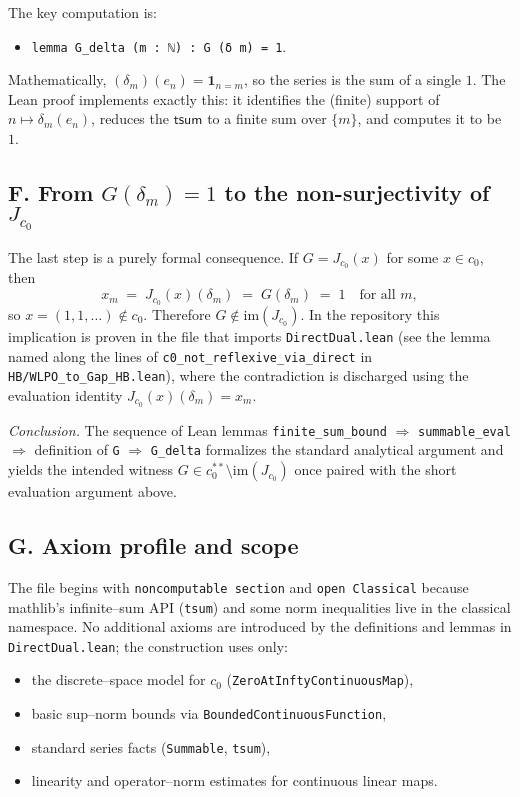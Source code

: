 \documentclass[11pt]{article}
\begin{document}
The key computation is:
\begin{itemize}
\item \verb|lemma G_delta (m : ℕ) : G (δ m) = 1|.
\end{itemize}
Mathematically, $(\delta_m)(e_n)=\mathbf 1_{n=m}$, so the series is the sum of a single $1$. The Lean proof implements exactly this: it identifies the (finite) support of $n\mapsto \delta_m(e_n)$, reduces the $\mathsf{tsum}$ to a finite sum over $\{m\}$, and computes it to be $1$.

\subsection*{F. From $G(\delta_m)=1$ to the non-surjectivity of $J_{c_0}$}

The last step is a purely formal consequence. If $G=J_{c_0}(x)$ for some $x\in c_0$, then
\[
x_m \;=\; J_{c_0}(x)(\delta_m) \;=\; G(\delta_m)\;=\;1 \quad\text{for all }m,
\]
so $x=(1,1,\dots)\notin c_0$. Therefore $G\not\in \mathrm{im}(J_{c_0})$. In the repository this implication is proven in the file that imports \texttt{DirectDual.lean} (see the lemma named along the lines of \texttt{c0\_not\_reflexive\_via\_direct} in \texttt{HB/WLPO\_to\_Gap\_HB.lean}), where the contradiction is discharged using the evaluation identity $J_{c_0}(x)(\delta_m)=x_m$.

\medskip
\noindent\emph{Conclusion.} The sequence of Lean lemmas \texttt{finite\_sum\_bound} $\Rightarrow$ \texttt{summable\_eval} $\Rightarrow$ definition of \texttt{G} $\Rightarrow$ \texttt{G\_delta} formalizes the standard analytical argument and yields the intended witness $G\in c_0^{\ast\ast}\setminus\mathrm{im}(J_{c_0})$ once paired with the short evaluation argument above.

\subsection*{G. Axiom profile and scope}

The file begins with \verb|noncomputable section| and \verb|open Classical| because mathlib's infinite--sum API (\verb|tsum|) and some norm inequalities live in the classical namespace. No additional axioms are introduced by the definitions and lemmas in \texttt{DirectDual.lean}; the construction uses only:
\begin{itemize}
\item the discrete--space model for $c_0$ (\verb|ZeroAtInftyContinuousMap|),
\item basic sup--norm bounds via \verb|BoundedContinuousFunction|,
\item standard series facts (\verb|Summable|, \verb|tsum|),
\item linearity and operator--norm estimates for continuous linear maps.
\end{itemize}
\end{document}
